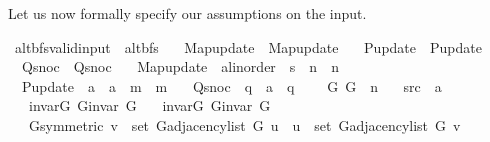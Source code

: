 \begin{isabellebody}
\begin{isamarkuptext}
Let us now formally specify our assumptions on the input.%
\end{isamarkuptext}\isamarkuptrue%
\isamarkupfalse%
\ alt{\isacharunderscore}{\kern0pt}bfs{\isacharunderscore}{\kern0pt}valid{\isacharunderscore}{\kern0pt}input\ {\isacharequal}{\kern0pt}\ alt{\isacharunderscore}{\kern0pt}bfs\ \isanewline
\ \ Map{\isacharunderscore}{\kern0pt}update\ {\isacharequal}{\kern0pt}\ Map{\isacharunderscore}{\kern0pt}update\ \isanewline
\ \ P{\isacharunderscore}{\kern0pt}update\ {\isacharequal}{\kern0pt}\ P{\isacharunderscore}{\kern0pt}update\ \isanewline
\ \ Q{\isacharunderscore}{\kern0pt}snoc\ {\isacharequal}{\kern0pt}\ Q{\isacharunderscore}{\kern0pt}snoc\ \isanewline
\ \ Map{\isacharunderscore}{\kern0pt}update\ {\isacharcolon}{\kern0pt}{\isacharcolon}{\kern0pt}\ {\isachardoublequoteopen}{\isacharprime}{\kern0pt}a{\isacharcolon}{\kern0pt}{\isacharcolon}{\kern0pt}linorder\ {\isasymRightarrow}\ {\isacharprime}{\kern0pt}s\ {\isasymRightarrow}\ {\isacharprime}{\kern0pt}n\ {\isasymRightarrow}\ {\isacharprime}{\kern0pt}n{\isachardoublequoteclose}\ \isanewline
\ \ P{\isacharunderscore}{\kern0pt}update\ {\isacharcolon}{\kern0pt}{\isacharcolon}{\kern0pt}\ {\isachardoublequoteopen}{\isacharprime}{\kern0pt}a\ {\isasymRightarrow}\ {\isacharprime}{\kern0pt}a\ {\isasymRightarrow}\ {\isacharprime}{\kern0pt}m\ {\isasymRightarrow}\ {\isacharprime}{\kern0pt}m{\isachardoublequoteclose}\ \isanewline
\ \ Q{\isacharunderscore}{\kern0pt}snoc\ {\isacharcolon}{\kern0pt}{\isacharcolon}{\kern0pt}\ {\isachardoublequoteopen}{\isacharprime}{\kern0pt}q\ {\isasymRightarrow}\ {\isacharprime}{\kern0pt}a\ {\isasymRightarrow}\ {\isacharprime}{\kern0pt}q{\isachardoublequoteclose}\ {\isacharplus}{\kern0pt}\isanewline
\ \ \ G{}\ G{}\ {\isacharcolon}{\kern0pt}{\isacharcolon}{\kern0pt}\ {\isacharprime}{\kern0pt}n\isanewline
\ \ \ src\ {\isacharcolon}{\kern0pt}{\isacharcolon}{\kern0pt}\ {\isacharprime}{\kern0pt}a\isanewline
\ \ \ invar{\isacharunderscore}{\kern0pt}G{}{\isacharcolon}{\kern0pt}\ {\isachardoublequoteopen}G{\isachardot}{\kern0pt}invar\ G{}{\isachardoublequoteclose}\isanewline
\ \ \ invar{\isacharunderscore}{\kern0pt}G{}{\isacharcolon}{\kern0pt}\ {\isachardoublequoteopen}G{\isachardot}{\kern0pt}invar\ G{}{\isachardoublequoteclose}\isanewline
\ \ \ G{}{\isacharunderscore}{\kern0pt}symmetric{\isacharcolon}{\kern0pt}\ {\isachardoublequoteopen}v\ {\isasymin}\ set\ {\isacharparenleft}{\kern0pt}G{\isachardot}{\kern0pt}adjacency{\isacharunderscore}{\kern0pt}list\ G{}\ u{\isacharparenright}{\kern0pt}\ {\isasymlongleftrightarrow}\ u\ {\isasymin}\ set\ {\isacharparenleft}{\kern0pt}G{\isachardot}{\kern0pt}adjacency{\isacharunderscore}{\kern0pt}list\ G{}\ v{\isacharparenright}{\kern0pt}{\isachardoublequoteclose}\isanewline

\end{isabellebody}
